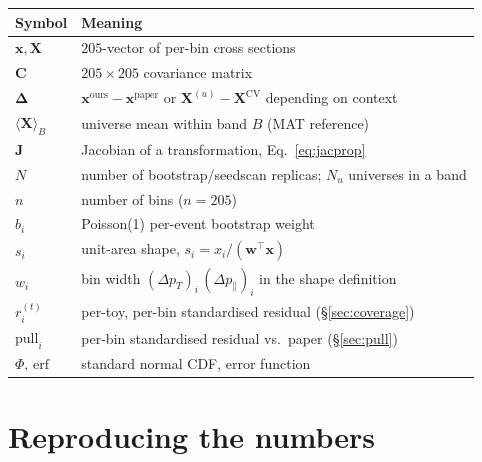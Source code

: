 \documentclass[12pt]{article}
\newcommand{\pT}{p_{T}}
\newcommand{\pPar}{p_{\parallel}}
\newcommand{\ours}{\text{ours}}
\newcommand{\paper}{\text{paper}}
\newcommand{\CV}{\text{CV}}
\newcommand{\T}{^{\!\top}}
\begin{document}
\begin{center}
\begin{tabular}{@{}ll@{}}
\toprule
Symbol & Meaning \\
\midrule
$\mathbf{x},\mathbf{X}$ & $205$-vector of per-bin cross sections \\
$\mathbf{C}$ & $205\times 205$ covariance matrix \\
$\boldsymbol{\Delta}$ & $\mathbf{x}^{\ours}-\mathbf{x}^{\paper}$ or
                       $\mathbf{X}^{(u)}-\mathbf{X}^{\CV}$ depending on context \\
$\langle\mathbf{X}\rangle_{B}$ & universe mean within band $B$ (MAT reference) \\
$\mathbf{J}$ & Jacobian of a transformation, Eq.~\eqref{eq:jacprop} \\
$N$ & number of bootstrap/seedscan replicas; $N_{u}$ universes in a band \\
$n$ & number of bins ($n=205$) \\
$b_{i}$ & Poisson(1) per-event bootstrap weight \\
$s_{i}$ & unit-area shape, $s_{i}=x_{i}/(\mathbf{w}\T\mathbf{x})$ \\
$w_{i}$ & bin width $(\Delta\pT)_{i}\,(\Delta\pPar)_{i}$ in the shape definition \\
$r^{(t)}_{i}$ & per-toy, per-bin standardised residual (\S\ref{sec:coverage}) \\
$\mathrm{pull}_{i}$ & per-bin standardised residual vs.\ paper (\S\ref{sec:pull}) \\
$\Phi,\,\mathrm{erf}$ & standard normal CDF, error function \\
\bottomrule
\end{tabular}
\end{center}

\section{Reproducing the numbers}
\label{app:reproduce}
\end{document}
